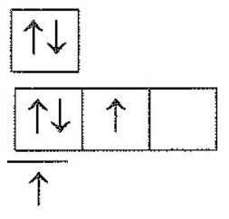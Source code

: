 \documentclass[10pt]{article}
\begin{document}
\includegraphics[max width=\textwidth, center]{2025_10_23_76620c17ffac1ae9b35bg-12(10)}\\
\includegraphics[max width=\textwidth, center]{2025_10_23_76620c17ffac1ae9b35bg-12(9)}\\
\includegraphics[max width=\textwidth, center]{2025_10_23_76620c17ffac1ae9b35bg-12(12)}\\
\end{document}
